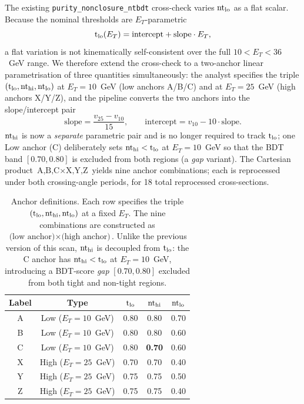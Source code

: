 \documentclass[11pt]{article}
\begin{document}
The existing \texttt{purity\_nonclosure\_ntbdt} cross-check varies
$\mathrm{nt}_{\rm lo}$ as a flat scalar. Because the nominal thresholds are
$E_T$-parametric
\begin{equation*}
  \mathrm{t}_{\rm lo}(E_T) = \text{intercept} + \text{slope} \cdot E_T,
\end{equation*}
a flat variation is not kinematically self-consistent over the full
$10 < E_T < 36$~GeV range. We therefore extend the cross-check to a
two-anchor linear parametrisation of three quantities simultaneously:
the analyst specifies the triple
$(\mathrm{t}_{\rm lo}, \mathrm{nt}_{\rm hi}, \mathrm{nt}_{\rm lo})$ at
$E_T = 10$~GeV (low anchors A/B/C) and at $E_T = 25$~GeV (high anchors
X/Y/Z), and the pipeline converts the two anchors into the
slope/intercept pair
\begin{equation*}
  \text{slope} = \frac{v_{25} - v_{10}}{15}, \qquad
  \text{intercept} = v_{10} - 10 \cdot \text{slope}.
\end{equation*}
$\mathrm{nt}_{\rm hi}$ is now a \emph{separate} parametric pair and is
no longer required to track $\mathrm{t}_{\rm lo}$; one Low anchor (C)
deliberately sets $\mathrm{nt}_{\rm hi} < \mathrm{t}_{\rm lo}$ at
$E_T = 10$~GeV so that the BDT band $[0.70, 0.80]$ is excluded from
both regions (a \emph{gap} variant). The Cartesian product
$\text{A,B,C} \times \text{X,Y,Z}$ yields nine anchor combinations;
each is reprocessed under both crossing-angle periods, for 18 total
reprocessed cross-sections.

\begin{table}[h!]
\centering
\caption{Anchor definitions. Each row specifies the triple
$(\mathrm{t}_{\rm lo}, \mathrm{nt}_{\rm hi}, \mathrm{nt}_{\rm lo})$ at a
fixed $E_T$. The nine combinations are constructed as
$\text{(low anchor)} \times \text{(high anchor)}$. Unlike the previous
version of this scan, $\mathrm{nt}_{\rm hi}$ is decoupled from
$\mathrm{t}_{\rm lo}$: the C anchor has
$\mathrm{nt}_{\rm hi} < \mathrm{t}_{\rm lo}$ at $E_T = 10$~GeV,
introducing a BDT-score \emph{gap} $[0.70, 0.80]$ excluded from both
tight and non-tight regions.}
\label{tab:anchors}
\begin{tabular}{c c c c c}
\toprule
Label & Type & $\mathrm{t}_{\rm lo}$ & $\mathrm{nt}_{\rm hi}$ &
                 $\mathrm{nt}_{\rm lo}$ \\
\midrule
A & Low   ($E_T = 10$~GeV) & 0.80 & 0.80  & 0.70 \\
B & Low   ($E_T = 10$~GeV) & 0.80 & 0.80  & 0.60 \\
C & Low   ($E_T = 10$~GeV) & 0.80 & \textbf{0.70} & 0.60 \\
\midrule
X & High  ($E_T = 25$~GeV) & 0.70 & 0.70  & 0.40 \\
Y & High  ($E_T = 25$~GeV) & 0.75 & 0.75  & 0.50 \\
Z & High  ($E_T = 25$~GeV) & 0.75 & 0.75  & 0.40 \\
\bottomrule
\end{tabular}
\end{table}
\end{document}
